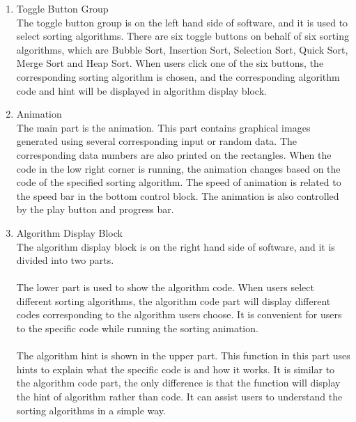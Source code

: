 \documentclass[paper=a4, fontsize=11pt,twoside]{scrartcl}		%
\begin{document}
\begin{enumerate}

\item Toggle Button Group\\
The toggle button group is on the left hand side of software, and it is used to select sorting algorithms. There are six toggle buttons on behalf of six sorting algorithms, which are Bubble Sort, Insertion Sort, Selection Sort, Quick Sort, Merge Sort and Heap Sort. When users click one of the six buttons, the corresponding sorting algorithm is chosen, and the corresponding algorithm code and hint will be displayed in algorithm display block.\\

\item Animation \\
The main part is the animation. This part contains graphical images generated using several corresponding input or random data. The corresponding data numbers are also printed on the rectangles. When the code in the low right corner is running, the animation changes based on the code of the specified sorting algorithm.  The speed of animation is related to the speed bar in the bottom control block. The animation is also controlled by the play button and progress bar. \\

\item Algorithm Display Block \\
The algorithm display block is on the right hand side of software, and it is divided into two parts. \\\\
 The lower part is used to show the algorithm code. When users select different sorting algorithms, the algorithm code part will display different codes corresponding to the algorithm users choose. It is convenient for users to the specific code while running the sorting animation. \\\\
 The algorithm hint is shown in the upper part. This function in this part uses hints to explain what the specific code is and how it works. It is similar to the algorithm code part, the only difference is that the function will display the hint of algorithm rather than code. It can assist users to understand the sorting algorithms in a simple way.\\


\end{enumerate}
\end{document}
